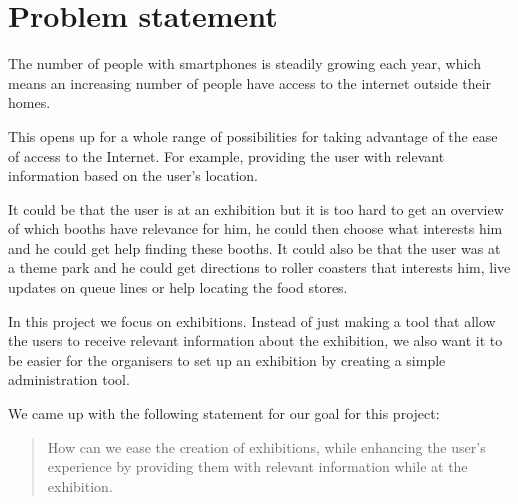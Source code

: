 \section{Problem statement}\label{sec:problemstatement}

The number of people with smartphones is steadily growing each year\citep{smartphonenumber}, which means an increasing number of people have access to the internet outside their homes.

This opens up for a whole range of possibilities for taking advantage of the ease of access to the Internet. For example, providing the user with relevant information based on the user's location. 

It could be that the user is at an exhibition but it is too hard to get an overview of which booths have relevance for him, he could then choose what interests him and he could get help finding these booths. It could also be that the user was at a theme park and he could get directions to roller coasters that interests him, live updates on queue lines or help locating the food stores.

In this project we focus on exhibitions. Instead of just making a tool that allow the users to receive relevant information about the exhibition, we also want it to be easier for the organisers to set up an exhibition by creating a simple administration tool.

We came up with the following statement for our goal for this project:

\begin{quote}
How can we ease the creation of exhibitions, while enhancing the user's experience by providing them with relevant information while at the exhibition.
\end{quote}

